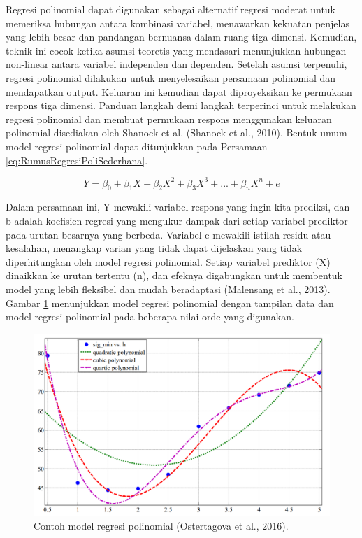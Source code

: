 Regresi polinomial dapat digunakan sebagai alternatif regresi moderat untuk memeriksa hubungan antara kombinasi variabel, menawarkan kekuatan penjelas yang lebih besar dan pandangan bernuansa dalam ruang tiga dimensi. Kemudian, teknik ini cocok ketika asumsi teoretis yang mendasari menunjukkan hubungan non-linear antara variabel independen dan dependen. Setelah asumsi terpenuhi, regresi polinomial dilakukan untuk menyelesaikan persamaan polinomial dan mendapatkan output. Keluaran ini kemudian dapat diproyeksikan ke permukaan respons tiga dimensi. Panduan langkah demi langkah terperinci untuk melakukan regresi polinomial dan membuat permukaan respons menggunakan keluaran polinomial disediakan oleh Shanock et al. (Shanock et al., 2010). Bentuk umum model regresi polinomial dapat ditunjukkan pada Persamaan \ref{eq:RumusRegresiPoliSederhana}.

\begin{equation}
  \label{eq:RumusRegresiPoliSederhana}
  Y = \beta_0 + \beta_1 X + \beta_2 X^2 + \beta_3 X^3 + ... + \beta_n X^n + e
\end{equation}

Dalam persamaan ini, Y mewakili variabel respons yang ingin kita prediksi, dan b adalah koefisien regresi yang mengukur dampak dari setiap variabel prediktor pada urutan besarnya yang berbeda. Variabel e mewakili istilah residu atau kesalahan, menangkap varian yang tidak dapat dijelaskan yang tidak diperhitungkan oleh model regresi polinomial. Setiap variabel prediktor (X) dinaikkan ke urutan tertentu (n), dan efeknya digabungkan untuk membentuk model yang lebih fleksibel dan mudah beradaptasi (Malensang et al., 2013). Gambar \ref{fig:plotregresipoli} menunjukkan model regresi polinomial dengan tampilan data dan model regresi polinomial pada beberapa nilai orde yang digunakan.

\begin{figure}[H]
  \centering
  \includegraphics[scale=0.35]{gambar/plotpolinomialsederhana.png}
  \caption{Contoh model regresi polinomial (Ostertagova et al., 2016).}
  \label{fig:plotregresipoli}
\end{figure}



